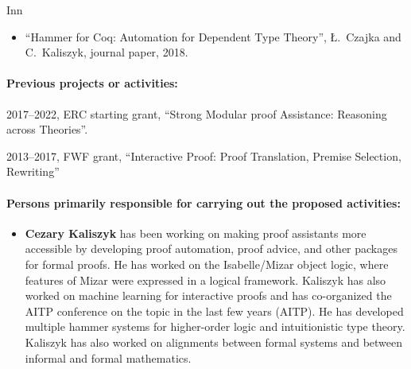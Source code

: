 \begin{sitedescription}{Inn}
\begin{itemize}
\item ``Hammer for Coq: Automation for Dependent Type Theory'', Ł.~Czajka and C.~Kaliszyk, journal paper, 2018.
\end{itemize}

\paragraph{Previous projects or activities:}

\begin{compactitem}
\item 2017--2022, ERC starting grant, ``Strong Modular proof Assistance: Reasoning across Theories''.
\item 2013--2017, FWF grant, ``Interactive Proof: Proof Translation, Premise Selection, Rewriting''
\end{compactitem}




\paragraph{Persons primarily responsible for carrying out the proposed activities:}

\begin{itemize}
\item \textbf{Cezary Kaliszyk} has been working on making proof assistants
more accessible by developing proof automation, proof advice, and other packages for formal
proofs. He has worked on the Isabelle/Mizar object logic, where features of Mizar were
expressed in a logical framework. Kaliszyk has also worked on machine learning for interactive
proofs and has co-organized the AITP conference on the topic in the last few years (AITP). He
has developed multiple hammer systems for higher-order logic and intuitionistic type theory.
Kaliszyk has also worked on alignments between formal systems and between informal and formal
mathematics.
\end{itemize}



\end{sitedescription}

